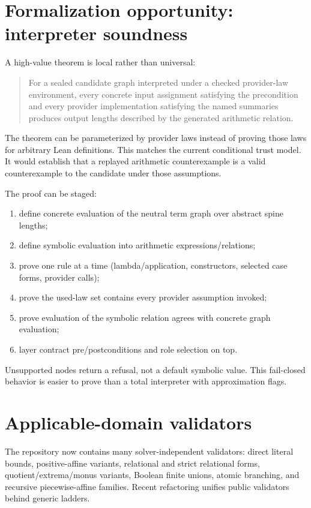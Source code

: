 \documentclass[10pt,letterpaper,oneside]{report}
\begin{document}
\section{Formalization opportunity: interpreter soundness}

A high-value theorem is local rather than universal:

\begin{quote}
For a sealed candidate graph interpreted under a checked provider-law environment, every concrete input assignment satisfying the precondition and every provider implementation satisfying the named summaries produces output lengths described by the generated arithmetic relation.
\end{quote}

The theorem can be parameterized by provider laws instead of proving those laws for arbitrary Lean definitions. This matches the current conditional trust model. It would establish that a replayed arithmetic counterexample is a valid counterexample to the candidate under those assumptions.

The proof can be staged:

\begin{enumerate}
  \item define concrete evaluation of the neutral term graph over abstract spine lengths;
  \item define symbolic evaluation into arithmetic expressions/relations;
  \item prove one rule at a time (lambda/application, constructors, selected case forms, provider calls);
  \item prove the used-law set contains every provider assumption invoked;
  \item prove evaluation of the symbolic relation agrees with concrete graph evaluation;
  \item layer contract pre/postconditions and role selection on top.
\end{enumerate}

Unsupported nodes return a refusal, not a default symbolic value. This fail-closed behavior is easier to prove than a total interpreter with approximation flags.

\section{Applicable-domain validators}

The repository now contains many solver-independent validators: direct literal bounds, positive-affine variants, relational and strict relational forms, quotient/extrema/monus variants, Boolean finite unions, atomic branching, and recursive piecewise-affine families. Recent refactoring unifies public validators behind generic ladders.
\end{document}
